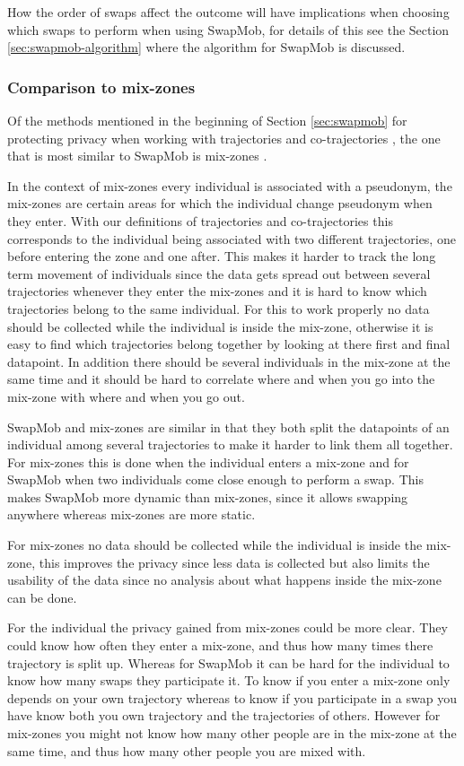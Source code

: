 \documentclass[12pt]{article}
\theoremstyle{definition}
\begin{document}
How the order of swaps affect the outcome will have implications when
choosing which swaps to perform when using SwapMob, for details of
this see the Section \ref{sec:swapmob-algorithm} where the algorithm
for SwapMob is discussed.

\subsubsection{Comparison to mix-zones}
\label{sec:compare-mix-zones}
Of the methods mentioned in the beginning of Section \ref{sec:swapmob}
for protecting privacy when working with trajectories and
co-trajectories , the one that is most similar to SwapMob is mix-zones
\cite{beresford_location_2003, beresford_mix_2004}.

In the context of mix-zones every individual is associated with a
pseudonym, the mix-zones are certain areas for which the individual
change pseudonym when they enter. With our definitions of trajectories
and co-trajectories this corresponds to the individual being
associated with two different trajectories, one before entering the
zone and one after. This makes it harder to track the long term
movement of individuals since the data gets spread out between several
trajectories whenever they enter the mix-zones and it is hard to know
which trajectories belong to the same individual. For this to work
properly no data should be collected while the individual is inside
the mix-zone, otherwise it is easy to find which trajectories belong
together by looking at there first and final datapoint. In addition
there should be several individuals in the mix-zone at the same time
and it should be hard to correlate where and when you go into the
mix-zone with where and when you go out.

SwapMob and mix-zones are similar in that they both split the
datapoints of an individual among several trajectories to make it
harder to link them all together. For mix-zones this is done when the
individual enters a mix-zone and for SwapMob when two individuals come
close enough to perform a swap. This makes SwapMob more dynamic than
mix-zones, since it allows swapping anywhere whereas mix-zones are
more static.

For mix-zones no data should be collected while the individual is
inside the mix-zone, this improves the privacy since less data is
collected but also limits the usability of the data since no analysis
about what happens inside the mix-zone can be done.

For the individual the privacy gained from mix-zones could be more
clear. They could know how often they enter a mix-zone, and thus how
many times there trajectory is split up. Whereas for SwapMob it can be
hard for the individual to know how many swaps they participate it. To
know if you enter a mix-zone only depends on your own trajectory
whereas to know if you participate in a swap you have know both you
own trajectory and the trajectories of others. However for mix-zones
you might not know how many other people are in the mix-zone at the
same time, and thus how many other people you are mixed with.
\end{document}
